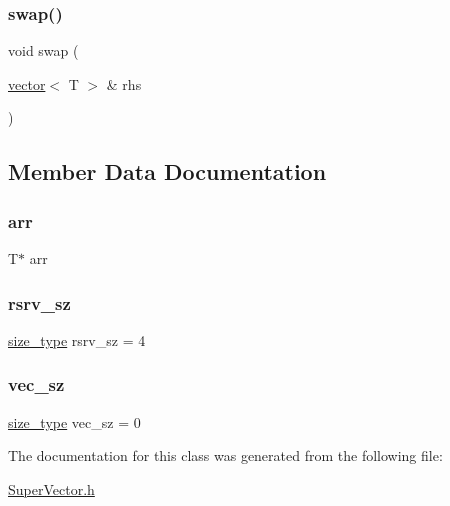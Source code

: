 \subsubsection{\texorpdfstring{swap()}{swap()}}
{\footnotesize\ttfamily void swap (\begin{DoxyParamCaption}\item[{\mbox{\hyperlink{classvector}{vector}}$<$ T $>$ \&}]{rhs }\end{DoxyParamCaption})}



\subsection{Member Data Documentation}
\mbox{\label{classvector_a146e9e7358f9c0ad7b78c73519623f6c}} 
\subsubsection{\texorpdfstring{arr}{arr}}
{\footnotesize\ttfamily T$\ast$ arr\hspace{0.3cm}{\ttfamily [private]}}

\mbox{\label{classvector_a6ba18857633bab5d161c8b61c262e1e7}} 
\subsubsection{\texorpdfstring{rsrv\+\_\+sz}{rsrv\_sz}}
{\footnotesize\ttfamily \mbox{\hyperlink{classvector_ada51e68d31936547d3729c82daf6b7c6}{size\+\_\+type}} rsrv\+\_\+sz = 4\hspace{0.3cm}{\ttfamily [private]}}

\mbox{\label{classvector_a0a11a0cb28b68616a2ce296acdfce192}} 
\subsubsection{\texorpdfstring{vec\+\_\+sz}{vec\_sz}}
{\footnotesize\ttfamily \mbox{\hyperlink{classvector_ada51e68d31936547d3729c82daf6b7c6}{size\+\_\+type}} vec\+\_\+sz = 0\hspace{0.3cm}{\ttfamily [private]}}



The documentation for this class was generated from the following file\+:\begin{DoxyCompactItemize}
\item 
\mbox{\hyperlink{SuperVector_8h}{Super\+Vector.\+h}}\end{DoxyCompactItemize}
